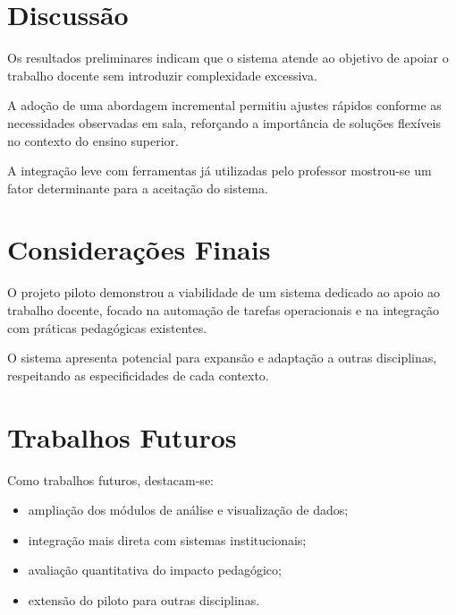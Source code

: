 \documentclass[12pt,a4paper]{article}
\begin{document}
\section{Discussão}

Os resultados preliminares indicam que o sistema atende ao objetivo de apoiar o trabalho docente sem introduzir complexidade excessiva.

A adoção de uma abordagem incremental permitiu ajustes rápidos conforme as necessidades observadas em sala, reforçando a importância de soluções flexíveis no contexto do ensino superior.

A integração leve com ferramentas já utilizadas pelo professor mostrou-se um fator determinante para a aceitação do sistema.

\section{Considerações Finais}

O projeto piloto demonstrou a viabilidade de um sistema dedicado ao apoio ao trabalho docente, focado na automação de tarefas operacionais e na integração com práticas pedagógicas existentes.

O sistema apresenta potencial para expansão e adaptação a outras disciplinas, respeitando as especificidades de cada contexto.

\section{Trabalhos Futuros}

Como trabalhos futuros, destacam-se:
\begin{itemize}[noitemsep]
  \item ampliação dos módulos de análise e visualização de dados;
  \item integração mais direta com sistemas institucionais;
  \item avaliação quantitativa do impacto pedagógico;
  \item extensão do piloto para outras disciplinas.
\end{itemize}
\end{document}
